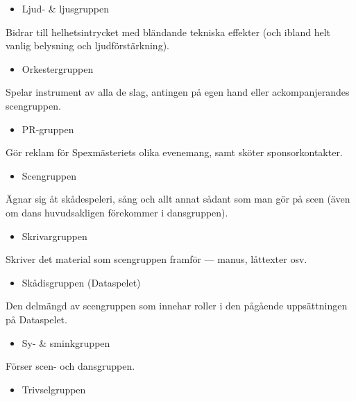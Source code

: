 \documentclass{dgovdoc}
\begin{document}
\begin{itemize}
  \item Ljud- \& ljusgruppen
\end{itemize}

Bidrar till helhetsintrycket med bländande tekniska effekter (och ibland helt vanlig belysning och ljudförstärkning).

\begin{itemize}
  \item Orkestergruppen
\end{itemize}

Spelar instrument av alla de slag, antingen på egen hand eller ackompanjerandes scengruppen.

\begin{itemize}
  \item PR-gruppen
\end{itemize}

Gör reklam för Spexmästeriets olika evenemang, samt sköter sponsorkontakter.

\begin{itemize}
  \item Scengruppen
\end{itemize}

Ägnar sig åt skådespeleri, sång och allt annat sådant som man gör på scen (även om dans huvudsakligen förekommer i dansgruppen).

\begin{itemize}
  \item Skrivargruppen
\end{itemize}

Skriver det material som scengruppen framför --- manus, låttexter osv.

\begin{itemize}
  \item Skådisgruppen (Dataspelet)
\end{itemize}

Den delmängd av scengruppen som innehar roller i den pågående uppsättningen på Dataspelet.

\begin{itemize}
  \item Sy- \& sminkgruppen
\end{itemize}

Förser scen- och dansgruppen.

\begin{itemize}
  \item Trivselgruppen
\end{itemize}
\end{document}
